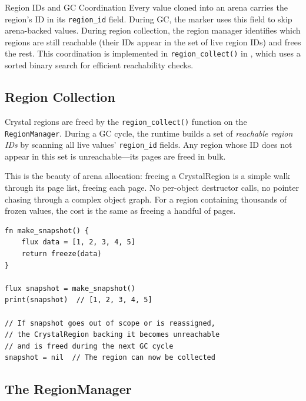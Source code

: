 \begin{notebox}{Region IDs and GC Coordination}
Every value cloned into an arena carries the region's ID in its \lstinline|region_id| field.
During GC, the marker uses this field to skip arena-backed values.
During region collection, the region manager identifies which regions are still reachable (their IDs appear in the set of live region IDs) and frees the rest.
This coordination is implemented in \lstinline|region_collect()| in , which uses a sorted binary search for efficient reachability checks.
\end{notebox}

\subsection{Region Collection}


Crystal regions are freed by the \lstinline|region_collect()| function on the \lstinline|RegionManager|.
During a GC cycle, the runtime builds a set of \emph{reachable region IDs} by scanning all live values' \lstinline|region_id| fields.
Any region whose ID does not appear in this set is unreachable---its pages are freed in bulk.

This is the beauty of arena allocation: freeing a CrystalRegion is a simple walk through its page list, freeing each page.
No per-object destructor calls, no pointer chasing through a complex object graph.
For a region containing thousands of frozen values, the cost is the same as freeing a handful of pages.

\begin{lstlisting}[language=Lattice, caption={Regions freed when no longer reachable}]
fn make_snapshot() {
    flux data = [1, 2, 3, 4, 5]
    return freeze(data)
}

flux snapshot = make_snapshot()
print(snapshot)  // [1, 2, 3, 4, 5]

// If snapshot goes out of scope or is reassigned,
// the CrystalRegion backing it becomes unreachable
// and is freed during the next GC cycle
snapshot = nil  // The region can now be collected
\end{lstlisting}

\subsection{The RegionManager}


